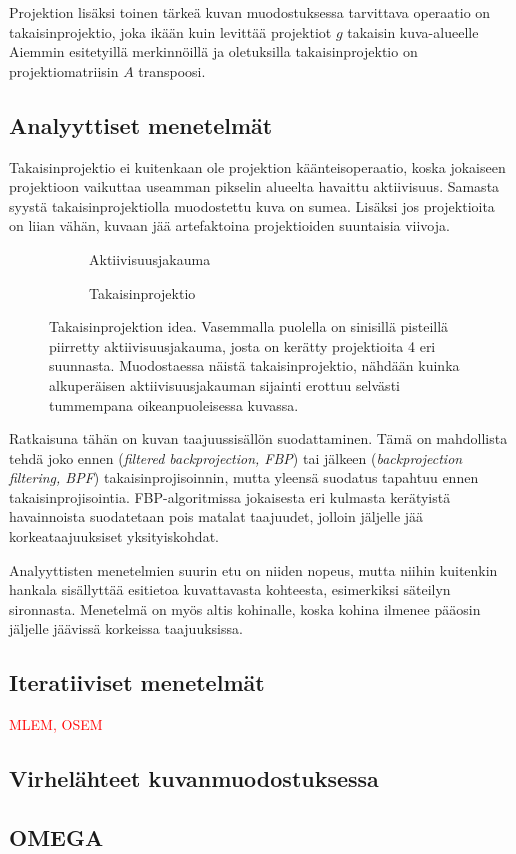 Projektion lisäksi toinen tärkeä kuvan muodostuksessa tarvittava operaatio on takaisinprojektio, joka ikään kuin levittää projektiot $g$ takaisin kuva-alueelle Aiemmin esitetyillä merkinnöillä ja oletuksilla takaisinprojektio on projektiomatriisin $A$ transpoosi.

\subsection{Analyyttiset menetelmät}
Takaisinprojektio ei kuitenkaan ole projektion käänteisoperaatio, koska jokaiseen projektioon vaikuttaa useamman pikselin alueelta havaittu aktiivisuus\cite{bruyant_analytic_2002}. Samasta syystä takaisinprojektiolla muodostettu kuva on sumea. Lisäksi jos projektioita on liian vähän, kuvaan jää artefaktoina projektioiden suuntaisia viivoja.

\begin{figure}[H]
    \centering
    \captionsetup{width=.9\textwidth}
    \begin{subfigure}[t]{.4\textwidth}
        \resizebox{\linewidth}{!}{}
        \caption{Aktiivisuusjakauma}
    \end{subfigure}%
    \begin{subfigure}[t]{.4\textwidth}
        \resizebox{\linewidth}{!}{}
        \caption{Takaisinprojektio}
    \end{subfigure}%
    \caption{Takaisinprojektion idea. Vasemmalla puolella on sinisillä pisteillä piirretty aktiivisuusjakauma, josta on kerätty projektioita 4 eri suunnasta. Muodostaessa näistä takaisinprojektio, nähdään kuinka alkuperäisen aktiivisuusjakauman sijainti erottuu selvästi tummempana oikeanpuoleisessa kuvassa.}
    \label{fig:takaisinprojektio}
\end{figure}

Ratkaisuna tähän on kuvan taajuussisällön suodattaminen. Tämä on mahdollista tehdä joko ennen (\textit{filtered backprojection, FBP}) tai jälkeen (\textit{backprojection filtering, BPF}) takaisinprojisoinnin, mutta yleensä suodatus tapahtuu ennen takaisinprojisointia.\cite{bruyant_analytic_2002} FBP-algoritmissa jokaisesta eri kulmasta kerätyistä havainnoista suodatetaan pois matalat taajuudet, jolloin jäljelle jää korkeataajuuksiset yksityiskohdat. 

Analyyttisten menetelmien suurin etu on niiden nopeus, mutta niihin kuitenkin hankala sisällyttää esitietoa kuvattavasta kohteesta, esimerkiksi säteilyn sironnasta. Menetelmä on myös altis kohinalle, koska kohina ilmenee pääosin jäljelle jäävissä korkeissa taajuuksissa.

\subsection{Iteratiiviset menetelmät}
\textcolor{red}{MLEM, OSEM}

\subsection{Virhelähteet kuvanmuodostuksessa}
\subsection{OMEGA}